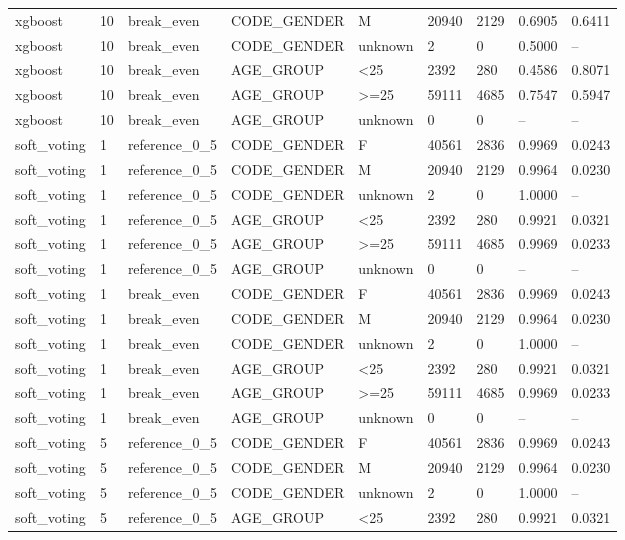 \begin{longtable}{lllllllll}
xgboost & 10 & break\_even & CODE\_GENDER & M & 20940 & 2129 & 0.6905 & 0.6411 \\
xgboost & 10 & break\_even & CODE\_GENDER & unknown & 2 & 0 & 0.5000 & -- \\
xgboost & 10 & break\_even & AGE\_GROUP & <25 & 2392 & 280 & 0.4586 & 0.8071 \\
xgboost & 10 & break\_even & AGE\_GROUP & >=25 & 59111 & 4685 & 0.7547 & 0.5947 \\
xgboost & 10 & break\_even & AGE\_GROUP & unknown & 0 & 0 & -- & -- \\
soft\_voting & 1 & reference\_0\_5 & CODE\_GENDER & F & 40561 & 2836 & 0.9969 & 0.0243 \\
soft\_voting & 1 & reference\_0\_5 & CODE\_GENDER & M & 20940 & 2129 & 0.9964 & 0.0230 \\
soft\_voting & 1 & reference\_0\_5 & CODE\_GENDER & unknown & 2 & 0 & 1.0000 & -- \\
soft\_voting & 1 & reference\_0\_5 & AGE\_GROUP & <25 & 2392 & 280 & 0.9921 & 0.0321 \\
soft\_voting & 1 & reference\_0\_5 & AGE\_GROUP & >=25 & 59111 & 4685 & 0.9969 & 0.0233 \\
soft\_voting & 1 & reference\_0\_5 & AGE\_GROUP & unknown & 0 & 0 & -- & -- \\
soft\_voting & 1 & break\_even & CODE\_GENDER & F & 40561 & 2836 & 0.9969 & 0.0243 \\
soft\_voting & 1 & break\_even & CODE\_GENDER & M & 20940 & 2129 & 0.9964 & 0.0230 \\
soft\_voting & 1 & break\_even & CODE\_GENDER & unknown & 2 & 0 & 1.0000 & -- \\
soft\_voting & 1 & break\_even & AGE\_GROUP & <25 & 2392 & 280 & 0.9921 & 0.0321 \\
soft\_voting & 1 & break\_even & AGE\_GROUP & >=25 & 59111 & 4685 & 0.9969 & 0.0233 \\
soft\_voting & 1 & break\_even & AGE\_GROUP & unknown & 0 & 0 & -- & -- \\
soft\_voting & 5 & reference\_0\_5 & CODE\_GENDER & F & 40561 & 2836 & 0.9969 & 0.0243 \\
soft\_voting & 5 & reference\_0\_5 & CODE\_GENDER & M & 20940 & 2129 & 0.9964 & 0.0230 \\
soft\_voting & 5 & reference\_0\_5 & CODE\_GENDER & unknown & 2 & 0 & 1.0000 & -- \\
soft\_voting & 5 & reference\_0\_5 & AGE\_GROUP & <25 & 2392 & 280 & 0.9921 & 0.0321 \\

\end{longtable}

